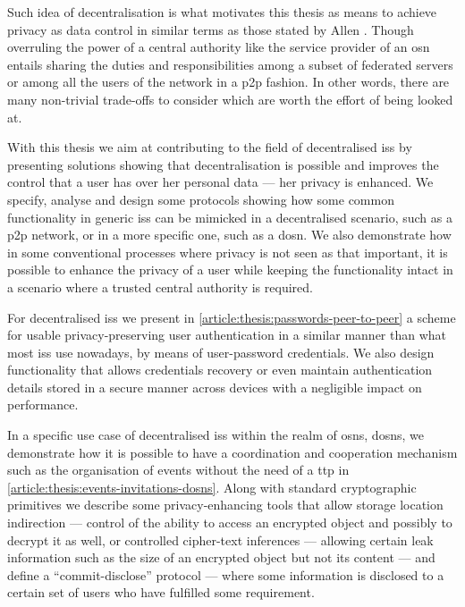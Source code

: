 Such idea of decentralisation is what motivates this thesis as means to achieve 
privacy as data control in similar terms as those stated by Allen \cite{Allen99}. 
Though overruling the power of a central authority like the service provider of 
an \ac{osn} entails sharing the duties and responsibilities among a subset of federated 
servers or among all the users of the network in a \ac{p2p} fashion. In other words, 
there are many non-trivial trade-offs to consider which are worth the effort of 
being looked at.

With this thesis we aim at contributing to the field of decentralised \acp{is} by 
presenting solutions showing that decentralisation is possible and improves the 
control that a user has over her personal data --- her privacy is enhanced. We specify, 
analyse and design some protocols showing how some common functionality in generic 
\acp{is} can be mimicked in a decentralised scenario, such as a \ac{p2p} network, 
or in a more specific one, such as a \ac{dosn}. We also demonstrate how in some 
conventional processes where privacy is not seen as that important, it is possible 
to enhance the privacy of a user while keeping the functionality intact in a scenario 
where a trusted central authority is required.

For decentralised \acp{is} we present in \cref{article:thesis:passwords-peer-to-peer} 
a scheme for usable privacy-preserving user authentication in a similar manner than 
what most \acp{is} use nowadays, by means of user-password credentials. We also 
design functionality that allows credentials recovery or even maintain authentication 
details stored in a secure manner across devices with a negligible impact on performance.

In a specific use case of decentralised \acp{is} within the realm of \acp{osn}, 
\acp{dosn}, we demonstrate how it is possible to have a coordination and cooperation 
mechanism such as the organisation of events without the need of a \acl{ttp} in \cref{article:thesis:events-invitations-dosns}. 
Along with standard cryptographic primitives we describe some privacy-enhancing 
tools that allow storage location indirection --- control of the ability to access 
an encrypted object and possibly to decrypt it as well, or controlled cipher-text 
inferences --- allowing certain leak information such as the size of an encrypted 
object but not its content --- and define a ``commit-disclose'' protocol --- where 
some information is disclosed to a certain set of users who have fulfilled some 
requirement.

